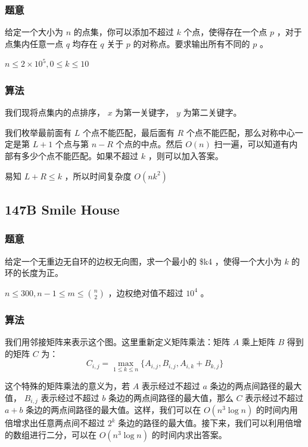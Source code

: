 \documentclass[11pt]{article}
\begin{document}
\subsubsection{题意}
\label{sec-9-3-1}

    给定一个大小为 $n$ 的点集，你可以添加不超过 $k$ 个点，使得存在一个点 $p$ ，对于点集内任意一点 $q$ 均存在 $q$ 关于 $p$ 的对称点。要求输出所有不同的 $p$ 。

    $n \leq 2 \times 10^5, 0 \leq k \leq 10$
\subsubsection{算法}
\label{sec-9-3-2}

    我们现将点集内的点排序， $x$ 为第一关键字， $y$ 为第二关键字。

    我们枚举最前面有 $L$ 个点不能匹配，最后面有 $R$ 个点不能匹配，那么对称中心一定是第 $L + 1$ 个点与第 $n - R$ 个点的中点。然后 $O(n)$ 扫一遍，可以知道有内部有多少个点不能匹配。如果不超过 $k$ ，则可以加入答案。

    易知 $L + R \leq k$ ，所以时间复杂度 $O(n k^2)$ 
\subsection{147B  Smile House}
\label{sec-9-4}
\subsubsection{题意}
\label{sec-9-4-1}

    给定一个无重边无自环的边权无向图，求一个最小的 \$k4 ，使得一个大小为 $k$ 的环的长度为正。

    $n \leq 300, n - 1 \leq m \leq {n \choose 2}$ ，边权绝对值不超过 $10^4$ 。
\subsubsection{算法}
\label{sec-9-4-2}

    我们用邻接矩阵来表示这个图。这里重新定义矩阵乘法：矩阵 $A$ 乘上矩阵 $B$ 得到的矩阵 $C$ 为：
    $$C_{i, j} = \max_{1 \leq k \leq n} \{A_{i, j}, B_{i, j}, A_{i, k} + B_{k, j}\}$$

    这个特殊的矩阵乘法的意义为，若 $A$ 表示经过不超过 $a$ 条边的两点间路径的最大值， $B_{i, j}$ 表示经过不超过 $b$ 条边的两点间路径的最大值，那么 $C$ 表示经过不超过 $a + b$ 条边的两点间路径的最大值。这样，我们可以在 $O(n^3 \log n)$ 的时间内用倍增求出任意两点间不超过 $2^k$ 条边的路径的最大值。接下来，我们可以利用倍增的数组进行二分，可以在 $O(n^3 \log n)$ 的时间内求出答案。
\end{document}
